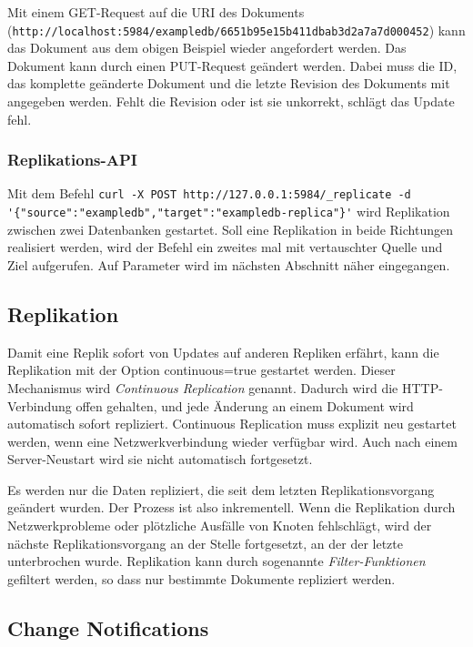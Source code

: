 Mit einem GET-Request auf die URI des Dokuments (\lstinline!http://localhost:5984/exampledb/6651b95e15b411dbab3d2a7a7d000452!) kann das Dokument aus dem obigen Beispiel wieder angefordert werden. Das Dokument kann durch einen PUT-Request geändert werden. Dabei muss die ID, das komplette geänderte Dokument und die letzte Revision des Dokuments mit angegeben werden. Fehlt die Revision oder ist sie unkorrekt, schlägt das Update fehl.

\subsubsection{Replikations-API}

Mit dem Befehl \lstinline!curl -X POST http://127.0.0.1:5984/_replicate -d '{"source":"exampledb","target":"exampledb-replica"}'! wird Replikation zwischen zwei Datenbanken gestartet. Soll eine Replikation in beide Richtungen realisiert werden, wird der Befehl ein zweites mal mit vertauschter Quelle und Ziel aufgerufen. Auf Parameter wird im nächsten Abschnitt näher eingegangen.





\subsection{Replikation}
\label{subsec:replikation-praxis}

Damit eine Replik sofort von Updates auf anderen Repliken erfährt, kann die Replikation mit der Option {\selectfont continuous=true} gestartet werden. Dieser Mechanismus wird \textit{Continuous Replication} genannt. Dadurch wird die HTTP-Verbindung offen gehalten, und jede Änderung an einem Dokument wird automatisch sofort repliziert. Continuous Replication muss explizit neu gestartet werden, wenn eine Netzwerkverbindung wieder verfügbar wird. Auch nach einem Server-Neustart wird sie nicht automatisch fortgesetzt.

Es werden nur die Daten repliziert, die seit dem letzten Replikationsvorgang geändert wurden. Der Prozess ist also inkrementell. Wenn die Replikation durch Netzwerkprobleme oder plötzliche Ausfälle von Knoten fehlschlägt, wird der nächste Replikationsvorgang an der Stelle fortgesetzt, an der der letzte unterbrochen wurde. Replikation kann durch sogenannte \textit{Filter-Funktionen} gefiltert werden, so dass nur bestimmte Dokumente repliziert werden.



\subsection{Change Notifications}
\label{subsec:change-notif}

